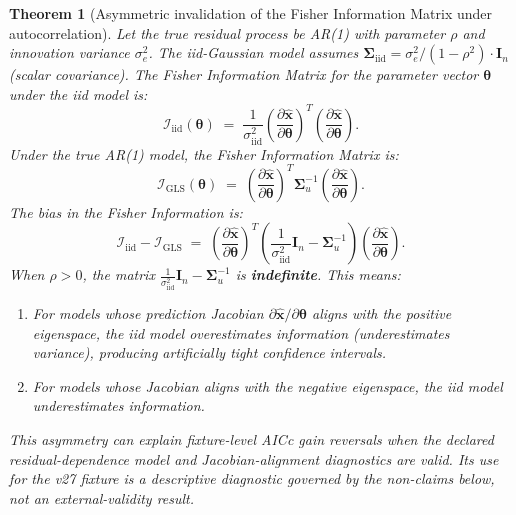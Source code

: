\documentclass[11pt]{article}
\newtheorem{theorem}{Theorem}
\begin{document}
\begin{theorem}[Asymmetric invalidation of the Fisher Information Matrix under autocorrelation]\label{thm:fisher-asymmetry}
Let the true residual process be AR(1) with parameter $\rho$ and innovation variance $\sigma_e^2$. The iid-Gaussian model assumes $\bm{\Sigma}_{\mathrm{iid}}=\sigma_e^2/(1-\rho^2)\cdot\bm{I}_n$ (scalar covariance). The Fisher Information Matrix for the parameter vector $\boldsymbol{\theta}$ under the iid model is:
\begin{equation}\label{eq:fisher-iid}
\mathcal{I}_{\mathrm{iid}}(\boldsymbol{\theta})\;=\;\frac{1}{\sigma_{\mathrm{iid}}^2}\left(\frac{\partial\bm{\hat{x}}}{\partial\boldsymbol{\theta}}\right)^T\left(\frac{\partial\bm{\hat{x}}}{\partial\boldsymbol{\theta}}\right).
\end{equation}
Under the true AR(1) model, the Fisher Information Matrix is:
\begin{equation}\label{eq:fisher-gls}
\mathcal{I}_{\mathrm{GLS}}(\boldsymbol{\theta})\;=\;\left(\frac{\partial\bm{\hat{x}}}{\partial\boldsymbol{\theta}}\right)^T\bm{\Sigma}_u^{-1}\left(\frac{\partial\bm{\hat{x}}}{\partial\boldsymbol{\theta}}\right).
\end{equation}
The bias in the Fisher Information is:
\begin{equation}\label{eq:fisher-bias}
\mathcal{I}_{\mathrm{iid}}-\mathcal{I}_{\mathrm{GLS}}\;=\;\left(\frac{\partial\bm{\hat{x}}}{\partial\boldsymbol{\theta}}\right)^T\left(\frac{1}{\sigma_{\mathrm{iid}}^2}\bm{I}_n-\bm{\Sigma}_u^{-1}\right)\left(\frac{\partial\bm{\hat{x}}}{\partial\boldsymbol{\theta}}\right).
\end{equation}
When $\rho>0$, the matrix $\frac{1}{\sigma_{\mathrm{iid}}^2}\bm{I}_n-\bm{\Sigma}_u^{-1}$ is \textbf{indefinite}. This means:
\begin{enumerate}
\item For models whose prediction Jacobian $\partial\bm{\hat{x}}/\partial\boldsymbol{\theta}$ aligns with the positive eigenspace, the iid model overestimates information (underestimates variance), producing artificially tight confidence intervals.
\item For models whose Jacobian aligns with the negative eigenspace, the iid model underestimates information.
\end{enumerate}
This asymmetry can explain fixture-level AICc gain reversals when the declared residual-dependence model and Jacobian-alignment diagnostics are valid. Its use for the v27 fixture is a descriptive diagnostic governed by the non-claims below, not an external-validity result.
\end{theorem}
\end{document}
